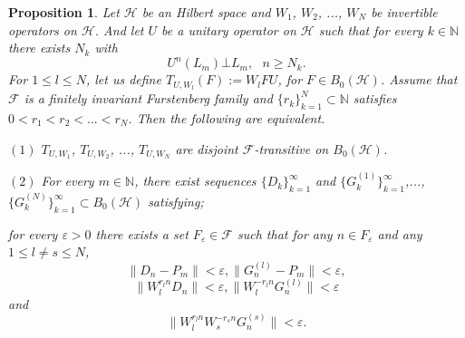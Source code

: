 \documentclass{article}
\newtheorem {proposition}[theorem]{Proposition}
\begin{document}
\begin{proposition}
Let $\mathcal{H}$ be an Hilbert space and $W_{1}$, $W_{2}$, ..., $W_{N}$ be invertible operators on $\mathcal{H}$. And let $U$ be a unitary operator on $\mathcal{H}$ such that for every $k\in\mathbb{N}$ there exists $N_{k}$ with 
\[U^{n}(L_{m})\bot L_{m}, \textrm{ } n\geq N_{k}.\]
For $1\leq l\leq N$, let us define $T_{U, W_{l}}(F):=W_{l}FU$, for $F\in B_{0}(\mathcal{H})$. 
Assume that $\mathcal{F}$ is a finitely invariant Furstenberg family and $\{r_{k}\}^{N}_{k=1}\subset \mathbb{N}$ satisfies $0<r_{1}<r_{2}<...<r_{N}$.  Then the following are equivalent.

$(1)$ $T_{U, W_{1}}$, $T_{U, W_{2}}$, ..., $T_{U, W_{N}}$ are disjoint $\mathcal{F}$-transitive on $B_{0}(\mathcal{H})$.

$(2)$ For every $m \in\mathbb{N}$, there exist sequences
$\{D_{k}\}^{\infty}_{k=1}$ and $\{G^{(1)}_{k}\}^{\infty}_{k=1}$,...,$\{G^{(N)}_{k}\}^{\infty}_{k=1}\subset B_{0}(\mathcal{H})$ satisfying;

for every $\varepsilon>0$ there exists a set $F_{\varepsilon}\in\mathcal{F}$ such that  for any $n\in F_{\varepsilon}$ and any $1\leq l\neq s \leq N$,
\[\|D_{n}-P_{m}\|<\varepsilon, \|G^{(l)}_{n}-P_{m}\|<\varepsilon,\]
\[\|W^{r_{l}n}_{l}D_{n}\|<\varepsilon, \|W^{-r_{l}n}_{l}G^{(l)}_{n}\|<\varepsilon\]
and
\[\|W^{r_{l}n}_{l}W^{-r_{s}n}_{s}G^{(s)}_{n}\|<\varepsilon.\]
\end{proposition}
\end{document}
